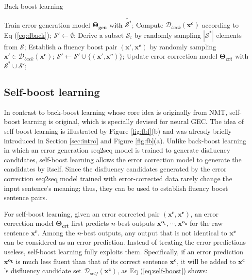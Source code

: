 \documentclass{article} %
\begin{document}
\begin{algorithm}[t]
\centering
\caption{Back-boost learning\label{alg:back-boost}}
\begin{algorithmic}[1]
\State Train error generation model $\boldsymbol{\Theta_{gen}}$ with $\widetilde{\mathcal{S}^*}$;
\State Compute $\mathcal{D}_{back}(\boldsymbol{x^c})$ according to Eq (\ref{eq:dback});
\EndFor
{}
\State $\mathcal{S'} \gets \emptyset$;
\State Derive a subset $\mathcal{S}_t$ by randomly sampling $|\mathcal{S}^*|$ elements from $\mathcal{S}$;
\State Establish a fluency boost pair $(\boldsymbol{x'},\boldsymbol{x^c})$ by randomly sampling $\boldsymbol{x'} \in \mathcal{D}_{back}(\boldsymbol{x^c})$;
\State $\mathcal{S'} \gets \mathcal{S'} \cup \{(\boldsymbol{x'},\boldsymbol{x^c})\}$;
\EndFor
\State Update error correction model $\boldsymbol{\Theta_{crt}}$ with $\mathcal{S}^* \cup \mathcal{S'}$;
\EndFor
\end{algorithmic}
\end{algorithm}

\subsection{Self-boost learning}\label{subsec:selfboost}

In contrast to back-boost learning whose core idea is originally from NMT, self-boost learning is original, which is specially devised for neural GEC. The idea of self-boost learning is illustrated by Figure \ref{fig:fbl}(b) and was already briefly introduced in Section \ref{sec:intro} and Figure \ref{fig:fb}(a). Unlike back-boost learning in which an error generation seq2seq model is trained to generate disfluency candidates, self-boost learning allows the error correction model to generate the candidates by itself. Since the disfluency candidates generated by the error correction seq2seq model trained with error-corrected data rarely change the input sentence's meaning; thus, they can be used to establish fluency boost sentence pairs.

For self-boost learning, given an error corrected pair $(\boldsymbol{x^r},\boldsymbol{x^c})$, an error correction model $\boldsymbol{\Theta_{crt}}$ first predicts $n$-best outputs $\boldsymbol{x^{o_1}}, \cdots, \boldsymbol{x^{o_n}}$ for the raw sentence $\boldsymbol{x^r}$. Among the $n$-best outputs, any output that is not identical to $\boldsymbol{x^c}$ can be considered as an error prediction. Instead of treating the error predictions useless, self-boost learning fully exploits them. Specifically, if an error prediction $\boldsymbol{x^{o_k}}$ is much less fluent than that of its correct sentence $\boldsymbol{x^c}$, it will be added to $\boldsymbol{x^c}$'s disfluency candidate set $\mathcal{D}_{self}(\boldsymbol{x^c})$, as Eq (\ref{eq:self-boost}) shows:
\end{document}
